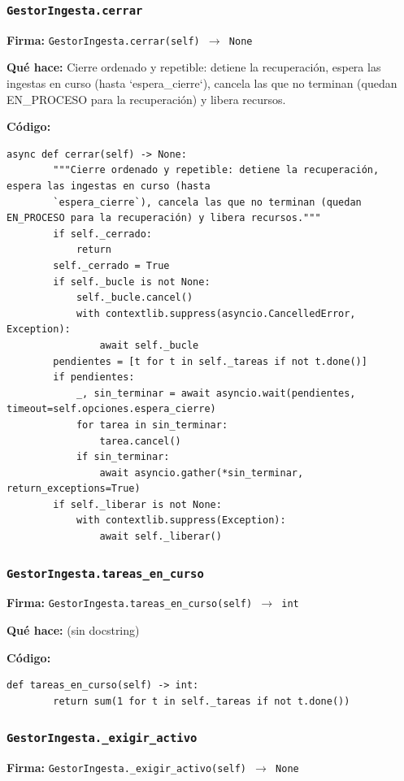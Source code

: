 \documentclass[11pt,a4paper]{article}
\begin{document}
\subsubsection*{\texttt{GestorIngesta.cerrar}}
\textbf{Firma:} \texttt{GestorIngesta.cerrar(self) $\rightarrow$ None}

\textbf{Qué hace:} Cierre ordenado y repetible: detiene la recuperación, espera las ingestas en curso (hasta
`espera\_cierre`), cancela las que no terminan (quedan EN\_PROCESO para la recuperación) y libera recursos.

\textbf{Código:}
\begin{lstlisting}
async def cerrar(self) -> None:
        """Cierre ordenado y repetible: detiene la recuperación, espera las ingestas en curso (hasta
        `espera_cierre`), cancela las que no terminan (quedan EN_PROCESO para la recuperación) y libera recursos."""
        if self._cerrado:
            return
        self._cerrado = True
        if self._bucle is not None:
            self._bucle.cancel()
            with contextlib.suppress(asyncio.CancelledError, Exception):
                await self._bucle
        pendientes = [t for t in self._tareas if not t.done()]
        if pendientes:
            _, sin_terminar = await asyncio.wait(pendientes, timeout=self.opciones.espera_cierre)
            for tarea in sin_terminar:
                tarea.cancel()
            if sin_terminar:
                await asyncio.gather(*sin_terminar, return_exceptions=True)
        if self._liberar is not None:
            with contextlib.suppress(Exception):
                await self._liberar()
\end{lstlisting}

\subsubsection*{\texttt{GestorIngesta.tareas\_en\_curso}}
\textbf{Firma:} \texttt{GestorIngesta.tareas\_en\_curso(self) $\rightarrow$ int}

\textbf{Qué hace:} (sin docstring)

\textbf{Código:}
\begin{lstlisting}
def tareas_en_curso(self) -> int:
        return sum(1 for t in self._tareas if not t.done())
\end{lstlisting}

\subsubsection*{\texttt{GestorIngesta.\_exigir\_activo}}
\textbf{Firma:} \texttt{GestorIngesta.\_exigir\_activo(self) $\rightarrow$ None}
\end{document}
